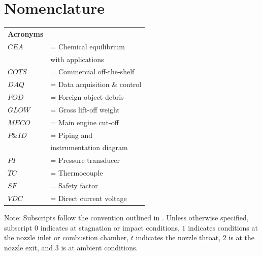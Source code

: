 \documentclass[9pt]{article} %
\numberwithin{equation}{section} %
\begin{document}
\section{Nomenclature} \label{sec: nomenclature}
\vspace{0.1cm}
\begin{tabular}{ll}
\textbf{Acronyms} \\ 
$CEA $ & = \quad Chemical equilibrium \\ 
$ $ & \qquad \enskip with applications \\
$COTS $ & = \quad Commercial off-the-shelf \\
$DAQ $ & = \quad Data acquisition \& control \\
$FOD $ & = \quad Foreign object debris \\
$GLOW $ & = \quad Gross lift-off weight \\
$MECO$ & = \quad Main engine cut-off \\
$P\&ID $ & = \quad Piping and \\
$ $ & \qquad \enskip instrumentation diagram\\
$PT $ & = \quad Pressure transducer \\
$TC $ & = \quad Thermocouple \\
$SF $ & = \quad Safety factor \\
$VDC $ & = \quad Direct current voltage \\
\end{tabular} 
\vspace{0.2cm} \newline
Note: Subscripts follow the convention outlined in \cite{rpe}. Unless otherwise specified, subscript $0$ indicates at stagnation or impact conditions, $1$ indicates conditions at the nozzle inlet or combustion chamber, $t$ indicates the nozzle throat, $2$ is at the nozzle exit, and $3$ is at ambient conditions.
\end{document}
